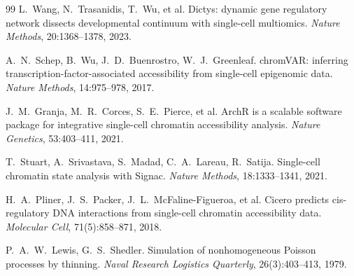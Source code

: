 \documentclass[a4paper, 11pt]{article}
\theoremstyle{plain}
\theoremstyle{remark}
\begin{document}
\begin{thebibliography}{99}
L.~Wang, N.~Trasanidis, T.~Wu, et al.
\newblock Dictys: dynamic gene regulatory network dissects developmental continuum with single-cell multiomics.
\newblock \emph{Nature Methods}, 20:1368--1378, 2023.

A.~N.~Schep, B.~Wu, J.~D.~Buenrostro, W.~J.~Greenleaf.
\newblock chromVAR: inferring transcription-factor-associated accessibility from single-cell epigenomic data.
\newblock \emph{Nature Methods}, 14:975--978, 2017.

J.~M.~Granja, M.~R.~Corces, S.~E.~Pierce, et al.
\newblock ArchR is a scalable software package for integrative single-cell chromatin accessibility analysis.
\newblock \emph{Nature Genetics}, 53:403--411, 2021.

T.~Stuart, A.~Srivastava, S.~Madad, C.~A.~Lareau, R.~Satija.
\newblock Single-cell chromatin state analysis with Signac.
\newblock \emph{Nature Methods}, 18:1333--1341, 2021.

H.~A.~Pliner, J.~S.~Packer, J.~L.~McFaline-Figueroa, et al.
\newblock Cicero predicts cis-regulatory DNA interactions from single-cell chromatin accessibility data.
\newblock \emph{Molecular Cell}, 71(5):858--871, 2018.

P.~A.~W.~Lewis, G.~S.~Shedler.
\newblock Simulation of nonhomogeneous Poisson processes by thinning.
\newblock \emph{Naval Research Logistics Quarterly}, 26(3):403--413, 1979.

\end{thebibliography}
\end{document}
